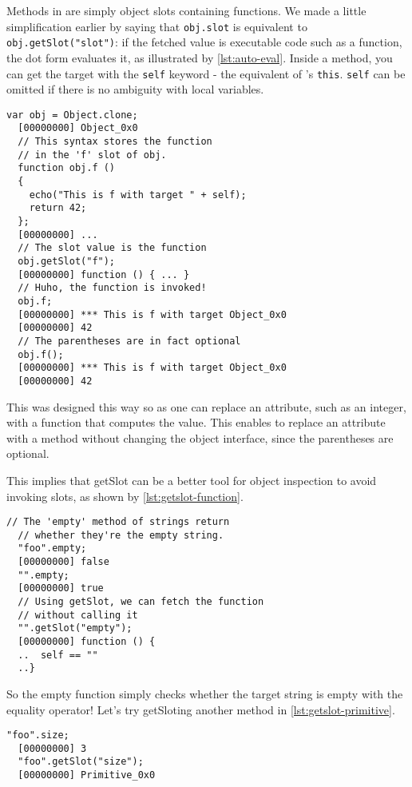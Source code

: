 \documentclass[openright,twoside,12pt]{report}
\newcommand{\lst}[1]{\autoref{lst:#1}}
\begin{document}
Methods in \urbi are simply object slots containing functions. We made
a little simplification earlier by saying that \lstinline|obj.slot| is
equivalent to \lstinline|obj.getSlot("slot")|: if the fetched value is
executable code such as a function, the dot form evaluates it, as
illustrated by \lst{auto-eval}. Inside a method, you can get the
target with the \lstinline|self| keyword - the equivalent of \Cxx's
\texttt{this}. \lstinline|self| can be omitted if there is no
ambiguity with local variables.

\begin{lstlisting}[caption=Function in object are automatically evaluated,
  label=lst:auto-eval]
  var obj = Object.clone;
  [00000000] Object_0x0
  // This syntax stores the function
  // in the 'f' slot of obj.
  function obj.f ()
  {
    echo("This is f with target " + self);
    return 42;
  };
  [00000000] ...
  // The slot value is the function
  obj.getSlot("f");
  [00000000] function () { ... }
  // Huho, the function is invoked!
  obj.f;
  [00000000] *** This is f with target Object_0x0
  [00000000] 42
  // The parentheses are in fact optional
  obj.f();
  [00000000] *** This is f with target Object_0x0
  [00000000] 42
\end{lstlisting}

This was designed this way so as one can replace an attribute, such as
an integer, with a function that computes the value. This enables to
replace an attribute with a method without changing the object
interface, since the parentheses are optional.

This implies that getSlot can be a better tool for object inspection
to avoid invoking slots, as shown by \lst{getslot-function}.

\begin{lstlisting}[caption=Inspecting executable slots with \texttt{getSlot},
  label=lst:getslot-function]
  // The 'empty' method of strings return
  // whether they're the empty string.
  "foo".empty;
  [00000000] false
  "".empty;
  [00000000] true
  // Using getSlot, we can fetch the function
  // without calling it
  "".getSlot("empty");
  [00000000] function () {
  ..  self == ""
  ..}
\end{lstlisting}

So the empty function simply checks whether the target string is empty
with the equality operator! Let's try getSloting another method in
\lst{getslot-primitive}.

\begin{lstlisting}[caption=Primitives, label=lst:getslot-primitive]
  "foo".size;
  [00000000] 3
  "foo".getSlot("size");
  [00000000] Primitive_0x0
\end{lstlisting}
\end{document}
